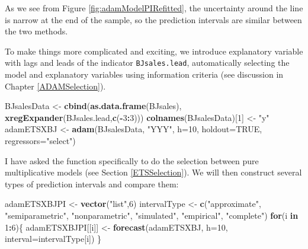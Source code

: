 \documentclass[]{book}
\newenvironment{Shaded}{\begin{snugshade}}{\end{snugshade}}
\newcommand{\ControlFlowTok}[1]{\textcolor[rgb]{0.13,0.29,0.53}{\textbf{#1}}}
\newcommand{\DataTypeTok}[1]{\textcolor[rgb]{0.13,0.29,0.53}{#1}}
\newcommand{\DecValTok}[1]{\textcolor[rgb]{0.00,0.00,0.81}{#1}}
\newcommand{\KeywordTok}[1]{\textcolor[rgb]{0.13,0.29,0.53}{\textbf{#1}}}
\newcommand{\NormalTok}[1]{#1}
\newcommand{\OperatorTok}[1]{\textcolor[rgb]{0.81,0.36,0.00}{\textbf{#1}}}
\newcommand{\OtherTok}[1]{\textcolor[rgb]{0.56,0.35,0.01}{#1}}
\newcommand{\StringTok}[1]{\textcolor[rgb]{0.31,0.60,0.02}{#1}}
\theoremstyle{definition}
\theoremstyle{definition}
\theoremstyle{definition}
\theoremstyle{definition}
\theoremstyle{remark}
\begin{document}
As we see from Figure \ref{fig:adamModelPIRefitted}, the uncertainty around the line is narrow at the end of the sample, so the prediction intervals are similar between the two methods.

To make things more complicated and exciting, we introduce explanatory variable with lags and leads of the indicator \texttt{BJsales.lead}, automatically selecting the model and explanatory variables using information criteria (see discussion in Chapter \ref{ADAMSelection}).

\begin{Shaded}
\begin{Highlighting}[]
\NormalTok{BJsalesData <-}\StringTok{ }\KeywordTok{cbind}\NormalTok{(}\KeywordTok{as.data.frame}\NormalTok{(BJsales),}
                     \KeywordTok{xregExpander}\NormalTok{(BJsales.lead,}\KeywordTok{c}\NormalTok{(}\OperatorTok{-}\DecValTok{3}\OperatorTok{:}\DecValTok{3}\NormalTok{)))}
\KeywordTok{colnames}\NormalTok{(BJsalesData)[}\DecValTok{1}\NormalTok{] <-}\StringTok{ "y"}
\NormalTok{adamETSXBJ <-}\StringTok{ }\KeywordTok{adam}\NormalTok{(BJsalesData, }\StringTok{"YYY"}\NormalTok{,}
                   \DataTypeTok{h=}\DecValTok{10}\NormalTok{, }\DataTypeTok{holdout=}\OtherTok{TRUE}\NormalTok{,}
                   \DataTypeTok{regressors=}\StringTok{"select"}\NormalTok{)}
\end{Highlighting}
\end{Shaded}

I have asked the function specifically to do the selection between pure multiplicative models (see Section \ref{ETSSelection}). We will then construct several types of prediction intervals and compare them:

\begin{Shaded}
\begin{Highlighting}[]
\NormalTok{adamETSXBJPI <-}\StringTok{ }\KeywordTok{vector}\NormalTok{(}\StringTok{"list"}\NormalTok{,}\DecValTok{6}\NormalTok{)}
\NormalTok{intervalType <-}\StringTok{ }\KeywordTok{c}\NormalTok{(}\StringTok{"approximate"}\NormalTok{, }\StringTok{"semiparametric"}\NormalTok{,}
                  \StringTok{"nonparametric"}\NormalTok{, }\StringTok{"simulated"}\NormalTok{,}
                  \StringTok{"empirical"}\NormalTok{, }\StringTok{"complete"}\NormalTok{)}
\ControlFlowTok{for}\NormalTok{(i }\ControlFlowTok{in} \DecValTok{1}\OperatorTok{:}\DecValTok{6}\NormalTok{)\{}
\NormalTok{  adamETSXBJPI[[i]] <-}\StringTok{ }\KeywordTok{forecast}\NormalTok{(adamETSXBJ, }\DataTypeTok{h=}\DecValTok{10}\NormalTok{,}
                                \DataTypeTok{interval=}\NormalTok{intervalType[i])}
\NormalTok{\}}
\end{Highlighting}
\end{Shaded}
\end{document}
